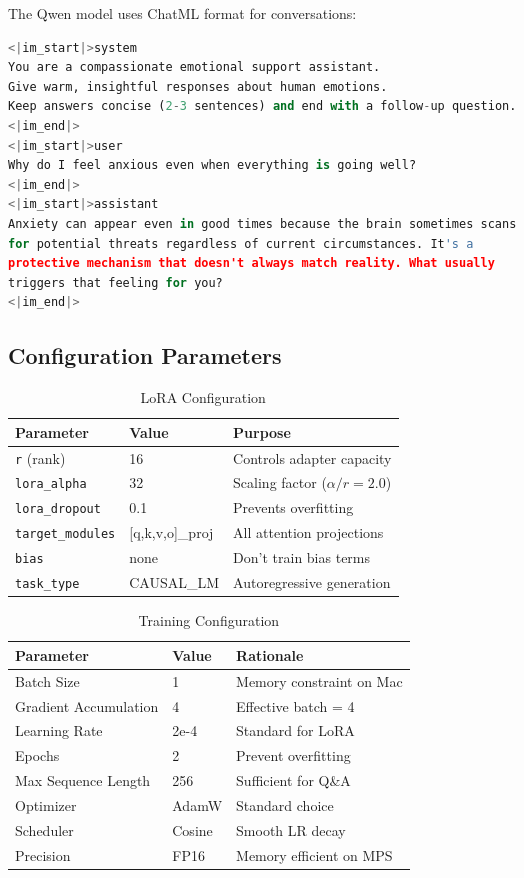 \documentclass[12pt,a4paper]{article}
\begin{document}
The Qwen model uses ChatML format for conversations:

\begin{lstlisting}[language=Python, caption=ChatML Format Structure]
<|im_start|>system
You are a compassionate emotional support assistant.
Give warm, insightful responses about human emotions.
Keep answers concise (2-3 sentences) and end with a follow-up question.
<|im_end|>
<|im_start|>user
Why do I feel anxious even when everything is going well?
<|im_end|>
<|im_start|>assistant
Anxiety can appear even in good times because the brain sometimes scans 
for potential threats regardless of current circumstances. It's a 
protective mechanism that doesn't always match reality. What usually 
triggers that feeling for you?
<|im_end|>
\end{lstlisting}

\subsection{Configuration Parameters}

\begin{table}[H]
\centering
\caption{LoRA Configuration}
\begin{tabular}{lll}
\toprule
\textbf{Parameter} & \textbf{Value} & \textbf{Purpose} \\
\midrule
\texttt{r} (rank) & 16 & Controls adapter capacity \\
\texttt{lora\_alpha} & 32 & Scaling factor ($\alpha/r = 2.0$) \\
\texttt{lora\_dropout} & 0.1 & Prevents overfitting \\
\texttt{target\_modules} & [q,k,v,o]\_proj & All attention projections \\
\texttt{bias} & none & Don't train bias terms \\
\texttt{task\_type} & CAUSAL\_LM & Autoregressive generation \\
\bottomrule
\end{tabular}
\end{table}

\begin{table}[H]
\centering
\caption{Training Configuration}
\begin{tabular}{lll}
\toprule
\textbf{Parameter} & \textbf{Value} & \textbf{Rationale} \\
\midrule
Batch Size & 1 & Memory constraint on Mac \\
Gradient Accumulation & 4 & Effective batch = 4 \\
Learning Rate & 2e-4 & Standard for LoRA \\
Epochs & 2 & Prevent overfitting \\
Max Sequence Length & 256 & Sufficient for Q\&A \\
Optimizer & AdamW & Standard choice \\
Scheduler & Cosine & Smooth LR decay \\
Precision & FP16 & Memory efficient on MPS \\
\bottomrule
\end{tabular}
\end{table}
\end{document}
